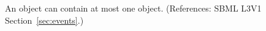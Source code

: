 An \Event object can contain at most one \Delay object. (References:
SBML L3V1 Section~\ref{sec:events}.)
